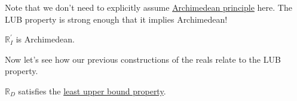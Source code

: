   Note that we don't need to explicitly assume \hyperref[def:archimedean-principle]{Archimedean principle} here. The LUB property is strong enough that it implies Archimedean!

  \begin{theorem}
    \label{thm:lub-property-implies-archimedean}
    $\mathbb{R}_I^\prime$ is Archimedean. 
  \end{theorem}

  Now let's see how our previous constructions of the reals relate to the LUB property. 

  \begin{theorem}
    \label{thm:dedekind-completed-reals-satisfies-lub-property}
    $\mathbb{R}_D$ satisfies the \hyperref[def:least-upper-bound-property]{least upper bound property}. 
  \end{theorem}

